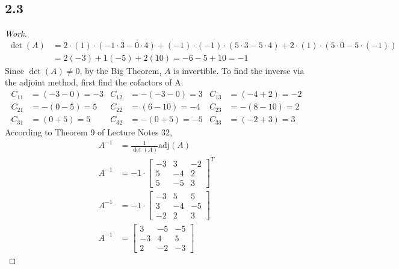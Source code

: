 \documentclass{article}
\begin{document}
\subsection*{2.3}

\begin{proof}[Work]
  \begin{align*}
    \det(A) & = 2 \cdot (1) \cdot (-1 \cdot 3 - 0 \cdot 4) + (-1) \cdot (-1) \cdot (5 \cdot 3 - 5 \cdot 4) + 2 \cdot (1) \cdot (5 \cdot 0 - 5 \cdot (-1)) \\
            & = 2(-3) + 1(-5) + 2(10) = -6 -5 + 10 = -1
  \end{align*}
  Since $\det(A) \neq 0$, by the Big Theorem, $A$ is invertible. To find the inverse via the adjoint method, first find the cofactors of A.
  \begin{align*}
    C_{11} & = (-3 - 0) = -3 & C_{12} & = -(-3-0) = 3 & C_{13} & = (-4+2) = -2 \\
    C_{21} & = -(0-5) = 5    & C_{22} & = (6-10) = -4 & C_{23} & = -(8-10) = 2 \\
    C_{31} & = (0+5) = 5     & C_{32} & = -(0+5) = -5 & C_{33} & = (-2+3) = 3
  \end{align*}
  According to Theorem 9 of Lecture Notes 32,
  \begin{align*}
    A^{-1} & = \frac{1}{\det(A)}\text{adj}(A) \\
    A^{-1} & = -1 \cdot \begin{bmatrix}
                          -3 & 3  & -2 \\
                          5  & -4 & 2  \\
                          5  & -5 & 3
                        \end{bmatrix}^T       \\
    A^{-1} & = -1 \cdot \begin{bmatrix}
                          -3 & 5  & 5  \\
                          3  & -4 & -5 \\
                          -2 & 2  & 3
                        \end{bmatrix}        \\
    A^{-1} & = \begin{bmatrix}
                 3  & -5 & -5 \\
                 -3 & 4  & 5  \\
                 2  & -2 & -3
               \end{bmatrix}
  \end{align*}
\end{proof}
\qdash
\end{document}
